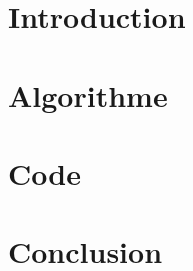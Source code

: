 \documentclass[11pt,a4paper, openany]{book}
\begin{document}
\pagebreak
\newpage


\newpage
\tableofcontents
\thispagestyle{empty}
\newpage

\chapter*{Introduction}


\chapter{Algorithme}


\chapter{Code}

\chapter*{Conclusion}


\newpage
\thispagestyle{empty}

\vspace*{\fill}
\begingroup
\begin{center}
\LaTeXe
\end{center}

\endgroup
\vspace*{\fill}
\end{document}

